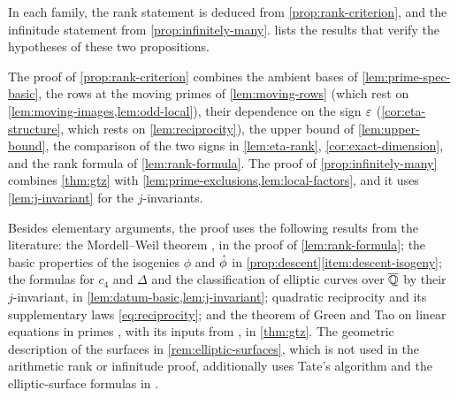 \begin{remark}\label{rem:proof-structure}
In each family, the rank statement is deduced from \cref{prop:rank-criterion}, and the infinitude statement from \cref{prop:infinitely-many}.  lists the results that verify the hypotheses of these two propositions.

The proof of \cref{prop:rank-criterion} combines the ambient bases of \cref{lem:prime-spec-basic}, the rows at the moving primes of \cref{lem:moving-rows} (which rest on \cref{lem:moving-images,lem:odd-local}), their dependence on the sign $\varepsilon$ (\cref{cor:eta-structure}, which rests on \cref{lem:reciprocity}), the upper bound of \cref{lem:upper-bound}, the comparison of the two signs in \cref{lem:eta-rank}, \cref{cor:exact-dimension}, and the rank formula of \cref{lem:rank-formula}. The proof of \cref{prop:infinitely-many} combines \cref{thm:gtz} with \cref{lem:prime-exclusions,lem:local-factors}, and it uses \cref{lem:j-invariant} for the $j$-invariants.

Besides elementary arguments, the proof uses the following results from the literature: the Mordell--Weil theorem \cite[Theorem~VIII.6.7]{SilvermanAEC}, in the proof of \cref{lem:rank-formula}; the basic properties of the isogenies $\phi$ and $\hat\phi$ in \cref{prop:descent}\ref{item:descent-isogeny}; the formulas for $c_4$ and $\Delta$ and the classification of elliptic curves over $\overline{\mathbb Q}$ by their $j$-invariant, in \cref{lem:datum-basic,lem:j-invariant}; quadratic reciprocity and its supplementary laws \eqref{eq:reciprocity}; and the theorem of Green and Tao on linear equations in primes \cite{GT2010}, with its inputs from \cite{GT2012,GTZ2012}, in \cref{thm:gtz}.
The geometric description of the surfaces in \cref{rem:elliptic-surfaces}, which is not used in the arithmetic rank or infinitude proof, additionally uses Tate's algorithm \cite{Tate1975} and the elliptic-surface formulas in \cite{SchuttShioda2010}.
\end{remark}

